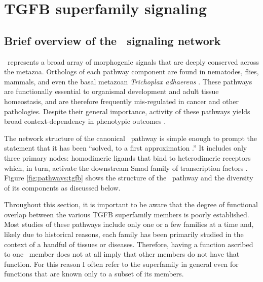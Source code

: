 \section{TGFB superfamily signaling}
\label{pathways:tgfb}

\subsection{Brief overview of the \tgfbsf\ signaling network}

\tgfbsf\ represents a broad array of morphogenic signals \cite{Schmierer2007} 
that are deeply conserved across the metazoa.
Orthologs of each pathway component are found in nematodes,
flies, mammals,
and even the basal metazoan \textit{Trichoplax adhaerens}
\cite{VonBubnoff2001,Srivastava2008,Huminiecki2009}.
These pathways are functionally essential to organismal development and
adult tissue homeostasis, and are therefore frequently mis-regulated
in cancer and other pathologies. Despite their general importance, activity of
these pathways yields broad context-dependency in phenotypic outcomes 
\cite{Massague1990,Massague2000,VonBubnoff2001,Wagner2007,Schmierer2007,
Umulis2009,Massague2012}.


The network structure of the canonical \tgfbsf\ pathway is simple
enough to prompt the statement that it has been ``solved, to a first 
approximation \cite{Massague2012}.'' It includes only three primary
nodes: homodimeric ligands 
that bind to heterodimeric receptors 
which, in turn, activate the downstream Smad family of
transcription factors
. Figure \ref{fig:pathways:tgfb} shows the
structure of the \tgfbsf\ pathway and the diversity of its components
as discussed below.


Throughout this section, it is important to be aware that
the degree of functional overlap between the various TGFB superfamily
members is poorly established. Most studies of these pathways include
only one or a few families at a time and, likely due to historical reasons, each family
has been primarily studied in the context of a handful of tissues or
diseases. Therefore, having a function ascribed to one \tgfbsf\
member does not at all imply that other members do not have that function.
For this reason I often refer to the superfamily in general even
for functions that are known only to a subset of its members.


